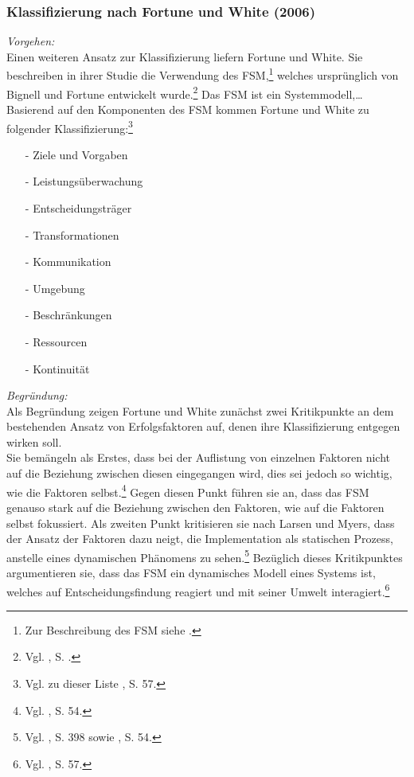 \noindent
\subsubsection{Klassifizierung nach Fortune und White (2006)}
\textit{Vorgehen:}\\\noindent
Einen weiteren Ansatz zur Klassifizierung liefern Fortune und White. Sie beschreiben in ihrer Studie die Verwendung des 
\ac{FSM},\footnote{Zur Beschreibung des FSM siehe \cite{White.2009}.} welches ursprünglich von Bignell und Fortune entwickelt wurde.\footnote{Vgl. \cite{Fortune.2006}, S. .}
Das FSM ist ein Systemmodell,\ldots
Basierend auf den Komponenten des \ac{FSM} kommen Fortune und White zu folgender Klassifizierung:\footnote{Vgl. zu dieser Liste \cite{Fortune.2006}, S. 57.}
\begin{itemize}\itemsep0pt
\item[-]{Ziele und Vorgaben}
\item[-]{Leistungsüberwachung}
\item[-]{Entscheidungsträger}
\item[-]{Transformationen}
\item[-]{Kommunikation}
\item[-]{Umgebung}
\item[-]{Beschränkungen}
\item[-]{Ressourcen}
\item[-]{Kontinuität}
\end{itemize}
\textit{Begründung:}\\\noindent
Als Begründung zeigen Fortune und White zunächst zwei Kritikpunkte an dem bestehenden Ansatz von Erfolgsfaktoren auf, denen ihre Klassifizierung entgegen wirken soll.\\\noindent
Sie bemängeln als Erstes, dass bei der Auflistung von einzelnen Faktoren nicht auf die Beziehung zwischen diesen eingegangen wird,
dies sei jedoch so wichtig, wie die Faktoren selbst.\footnote{Vgl. \cite{Fortune.2006}, S. 54.}
Gegen diesen Punkt führen sie an, dass das \ac{FSM} genauso stark auf die Beziehung zwischen den Faktoren, wie auf die Faktoren selbst fokussiert.
Als zweiten Punkt kritisieren sie nach Larsen und Myers, dass der Ansatz der Faktoren dazu neigt, die Implementation als
statischen Prozess, anstelle eines dynamischen Phänomens zu sehen.\footnote{Vgl. \cite{Larsen.1999}, S. 398 sowie \cite{Fortune.2006}, S. 54.}
Bezüglich dieses Kritikpunktes argumentieren sie, dass das \ac{FSM} ein dynamisches Modell eines Systems ist, welches auf Entscheidungsfindung reagiert und mit seiner
Umwelt interagiert.\footnote{Vgl. \cite{Fortune.2006}, S. 57.}
